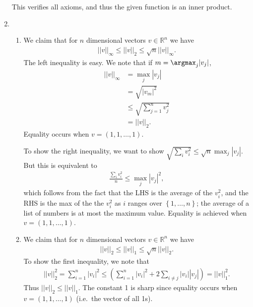 \documentclass{article}
\newcommand{\RR}{\mathbb{R}}
\begin{document}
\begin{enumerate}
    This verifies all axioms, and thus the given function is an inner product.
  \item 
    \begin{enumerate}
      \item We claim that for $n$ dimensional vectors $v \in \RR^n$ we have
        \begin{align*}
          ||v||_{\infty} \leq ||v||_2 \leq  \sqrt{n} ||v||_{\infty}.
        \end{align*}
        The left inequality is easy.  We note that if $m = \argmax_{j} |v_j|$,
        \begin{align*}
          ||v||_{\infty} &= \max_{j} |v_j| \\
          &= \sqrt{|v_m|^2} \\
          &\leq \sqrt{\sum_{j=1}^{n} v_j^2} \\
          &= ||v||_2.
        \end{align*}
        Equality occurs when $v = (1, 1, \dots, 1)$.

        To show the right inequality, we want to show $\sqrt{\sum_{i} v_i^2} \leq \sqrt{n} \max_j |v_j|$.  But this is equivalent to
        \begin{align*}
          \frac{\sum_i v_i^2}{ n} \leq \max_j |v_j|^2,
        \end{align*}
        which follows from the fact that the LHS is the average of the $v_i^2$, and the RHS is the max of the the $v_i^2$ as $i$ ranges over $\left\{ 1, \dots, n \right\}$; the average of a list of numbers is at most the maximum value.  Equality is achieved when $v = (1, 1, \dots, 1)$.

      \item We claim that for $n$ dimensional vectors $v \in \RR^n$ we have
        \begin{align*}
          ||v||_2 \leq ||v||_1 \leq \sqrt{n} ||v||_2.
        \end{align*}
        To show the first inequality, we note that
        \begin{align*}
          ||v||_2^2 = \sum_{i=1}^{n} |v_i|^2 \leq \left( \sum_{i=1}^{n} |v_i|^2 + 2 \sum_{i \neq j} |v_i| |v_j|  \right) = ||v||_1^2.
        \end{align*}
        Thus $||v||_2 \leq ||v||_1$.  The constant 1 is sharp since equality occurs when $v = (1, 1, \dots, 1)$ (i.e.\ the vector of all 1s).


\end{enumerate}
\end{enumerate}
\end{document}
